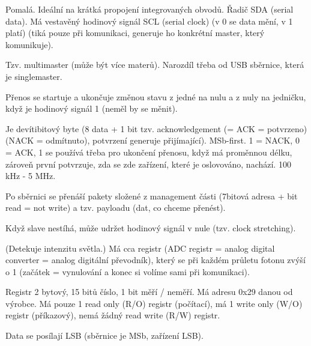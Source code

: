 \documentclass[12pt]{article}					%
\begin{document}
        \begin{definice}[$I^2 C$ = Inter Integrated Circuit]
            Pomalá. Ideální na krátká propojení integrovaných obvodů. Řadič SDA (serial data). Má vestavěný hodinový signál SCL (serial clock) (v 0 se data mění, v 1 platí) (tiká pouze při komunikaci, generuje ho konkrétní master, který komunikuje).

            Tzv. multimaster (může být více materů). Narozdíl třeba od USB sběrnice, která je singlemaster.

            Přenos se startuje a ukončuje změnou stavu z jedné na nulu a z nuly na jedničku, když je hodinový signál 1 (neměl by se měnit).

            Je devítibitový byte (8 data + 1 bit tzv. acknowledgement (= ACK = potvrzeno) (NACK = odmítnuto), potvrzení generuje přijímající). MSb-first. 1 = NACK, 0 = ACK, 1 se používá třeba pro ukončení přenosu, když má proměnnou délku, zároveň první potvrzuje, zda se zde zařízení, které je oslovováno, nachází. 100 kHz - 5 MHz.

            Po sběrnici se přenáší pakety složené z management části (7bitová adresa + bit read = not write) a tzv. payloadu (dat, co chceme přenést).

            Když slave nestíhá, může udržet hodinový signál v nule (tzv. clock stretching).
        \end{definice}

        \begin{priklady}[ALS = Ambient Light Sensor (konkrétní od everlight)]
            (Detekuje intenzitu světla.) Má cca registr (ADC registr = analog digital converter = analog digitální převodník), který se při každém průletu fotonu zvýší o 1 (začátek = vynulování a konec si volíme sami při komunikaci).

            Registr 2 bytový, 15 bitů číslo, 1 bit měří / neměří. Má adresu 0x29 danou od výrobce. Má pouze 1 read only (R/O) registr (počítací), má 1 write only (W/O) registr (příkazový), nemá žádný read write (R/W) registr.

            Data se posílají LSB (sběrnice je MSb, zařízení LSB).
        \end{priklady}

\end{document}

